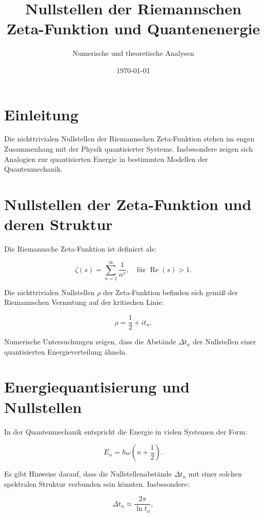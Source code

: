 \documentclass[a4paper,12pt]{article}
\title{Nullstellen der Riemannschen Zeta-Funktion und Quantenenergie}
\author{Numerische und theoretische Analysen}
\date{\today}
\begin{document}
\maketitle

\section{Einleitung}
Die nichttrivialen Nullstellen der Riemannschen Zeta-Funktion stehen im engen Zusammenhang mit der Physik quantisierter Systeme. Insbesondere zeigen sich Analogien zur quantisierten Energie in bestimmten Modellen der Quantenmechanik.

\section{Nullstellen der Zeta-Funktion und deren Struktur}
Die Riemannsche Zeta-Funktion ist definiert als:

\begin{equation}
\zeta(s) = \sum_{n=1}^{\infty} \frac{1}{n^s}, \quad \text{für } \operatorname{Re}(s) > 1.
\end{equation}

Die nichttrivialen Nullstellen \( \rho \) der Zeta-Funktion befinden sich gemäß der Riemannschen Vermutung auf der kritischen Linie:

\begin{equation}
\rho = \frac{1}{2} + i t_n.
\end{equation}

Numerische Untersuchungen zeigen, dass die Abstände \( \Delta t_n \) der Nullstellen einer quantisierten Energieverteilung ähneln.

\section{Energiequantisierung und Nullstellen}
In der Quantenmechanik entspricht die Energie in vielen Systemen der Form:

\begin{equation}
E_n = \hbar \omega \left( n + \frac{1}{2} \right).
\end{equation}

Es gibt Hinweise darauf, dass die Nullstellenabstände \( \Delta t_n \) mit einer solchen spektralen Struktur verbunden sein könnten. Insbesondere:

\begin{equation}
\Delta t_n \approx \frac{2\pi}{\ln t_n},
\end{equation}
\end{document}
